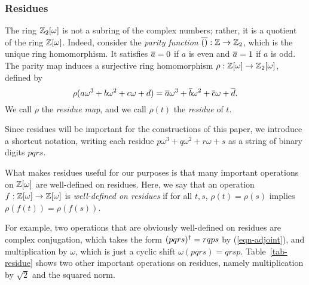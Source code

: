 
\subsubsection{Residues} %
\label{ssub:residues}
\begin{remark}
  The ring $\mathbb{Z}_2[\omega]$ is not a subring of the complex numbers; rather, it is a quotient of the ring
  $\mathbb{Z}[\omega]$. Indeed, consider the {\em parity function} $\overline{()}\/:\mathbb{Z}\to\mathbb{Z}_2$, which is the unique
  ring homomorphism. It satisfies $\overline{a}\/=0$ if $a$ is even and $\overline{a}\/=1$ if $a$ is odd.
  The parity map induces a surjective ring homomorphism $\rho:\mathbb{Z}[\omega]\to\mathbb{Z}_2[\omega]$, defined by
  \[ 
    \rho(a\omega^3+b\omega^2+c\omega+d) =
    \overline{a}\/\omega^3+\overline{b}\/\omega^2+\overline{c}\/\omega+\overline{d}\/.
  \]
  We call $\rho$ the {\em residue map}, and we call $\rho(t)$ the {\em residue} of $t$.
\end{remark}

\begin{convention}
  Since residues will be important for the constructions of this paper, we introduce a shortcut
  notation, writing each residue $p\omega^3+q\omega^2+r\omega+s$ as a string of binary digits
  $pqrs$.
\end{convention}

What makes residues useful for our purposes is that many important operations on $\mathbb{Z}[\omega]$ are
well-defined on residues. Here, we say that an operation $f:\mathbb{Z}[\omega]\to\mathbb{Z}[\omega]$ is {\em well-defined on
residues} if for all $t,s$, $\rho(t)=\rho(s)$ implies $\rho(f(t))=\rho(f(s))$.

For example, two operations that are obviously well-defined on residues are complex conjugation,
which takes the form $(pqrs)^{\dagger} = rqps$ by (\ref{eqn-adjoint}), and multiplication by $\omega$,
which is just a cyclic shift $\omega(pqrs)=qrsp$. Table~\ref{tab-residue} shows two other important
operations on residues, namely multiplication by $\sqrt{2}$ and the squared norm.

